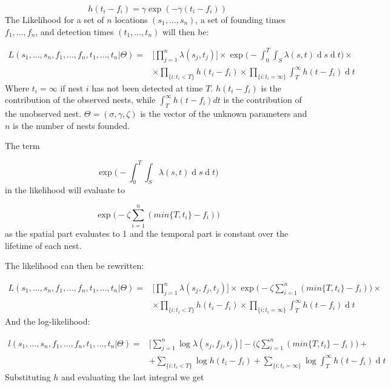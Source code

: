 \documentclass[11pt,a4paper]{article}
\renewcommand{\d}[1]{\ensuremath{\operatorname{d}\!{#1}}}
\begin{document}
\[
h(t_{i} - f_{i}) = \gamma \exp (- \gamma(t_{i} - f_{i}))
\]
The Likelihood for a set of $n$ locations $(s_{1}, ... , s_{n})$, a set of founding times $f_{1}, ... , f_{n}$, and detection times $(t_{1},  ... , t_{n})$ will then be:

\[
\begin{aligned}
L(s_{1}, ..., s_{n}, f_{1}, ..., f_{n}, t_{1}, ..., t_{n} | \Theta) = & \Bigg[ \prod_{j=1}^{n} \lambda(s_{j}, t_{j}) \Bigg] \times \exp \Bigg(- \int_{0}^{T} \int_{S} \lambda(s, t) \d s \d t \Bigg) \times \\ 
& \times \prod_{\{ i : t_{i} < T \} } h (t_{i} - f_{i}) \times \prod_{ \{ i : t_{i} = \infty \} } \int_{T}^{\infty} h(t - f_{i}) \d t
\end{aligned}
\]
Where $t_{i} = \infty$ if nest $i$ has not been detected at time $T$. $h(t_{i} - f_{i})$ is the contribution of the observed nests, while $\int_{T}^{\infty} h(t - f_{i}) dt$ is the contribution of the unobserved nest. $\Theta= ( \sigma, \gamma, \zeta)$ is the vector of the unknown parameters and $n$ is the number of nests founded.

The term 

\begin{equation}
\exp \bigg(- \int_{0}^{T} \int_{S} \lambda(s, t)\d s \d t \bigg)
\end{equation}
in the likelihood will evaluate to 


\[
\exp \bigg(- \zeta \sum_{i=1}^{n} (min\{ T, t_i \} - f_i) \bigg)
\]
as the spatial part evaluates to 1 and the temporal part is constant over the lifetime of each nest.

The likelihood can then be rewritten:

\[
\begin{aligned}
L(s_{1}, ..., s_{n}, f_{1}, ..., f_{n}, t_{1}, ..., t_{n} | \Theta) = & \Bigg[ \prod_{j=1}^{n} \lambda(s_{j},f_{j}, t_{j}) \Bigg] \times \exp \bigg(-\zeta \sum_{i=1}^{n} (min\{ T, t_i \} - f_i) \bigg)  \times \\
& \times \prod_{\{ i : t_{i} < T \} }  h (t_{i} - f_{i}) \times \prod_{ \{ i : t_{i} = \infty \} } \int_{T}^{\infty} h(t - f_{i}) \d t
\end{aligned}
\]
And the log-likelihood:

\[
\begin{aligned}
l(s_{1}, ..., s_{n}, f_{1}, ..., f_{n}, t_{1}, ..., t_{n} | \Theta) = & \Bigg[ \sum_{j=1}^{n} \log \lambda(s_{j},f_{j}, t_{j}) \Bigg] - \bigg(\zeta \sum_{i=1}^{n} (min\{ T, t_i \} - f_i) \bigg)  + \\
& + \sum_{\{ i : t_{i} < T \} }  \log h (t_{i} - f_{i}) + \sum_{ \{ i : t_{i} = \infty \} } \log \int_{T}^{\infty} h(t - f_{i}) \d t
\end{aligned}
\]
Substituting $h$ and evaluating the last integral we get 
\end{document}
